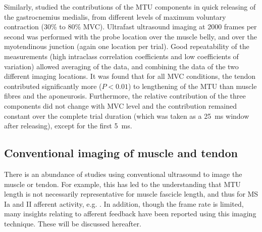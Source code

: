 Similarly, \citet{farcy_interaction_2014} studied the contributions of the MTU components in quick releasing of the gastrocnemius medialis, from different levels of maximum voluntary contraction (30\% to 80\% MVC). Ultrafast ultrasound imaging at 2000 frames per second was performed with the probe location over the muscle belly, and over the myotendinous junction (again one location per trial). Good repeatability of the measurements (high intraclass correlation coefficients and low coefficients of variation) allowed averaging of the data, and combining the data of the two different imaging locations. It was found that for all MVC conditions, the tendon contributed significantly more ($P<0.01$) to lengthening of the MTU than muscle fibres and the aponeurosis. 
Furthermore, the relative contribution of the three components did not change with MVC level and the contribution remained constant over the complete trial duration (which was taken as a \SI{25}{\milli\second} window after releasing), except for the first \SI{5}{\milli\second}. 






\subsection{Conventional imaging of muscle and tendon}
There is an abundance of studies using conventional ultrasound to image the muscle or tendon. For example, this has led to the understanding that MTU length is not necessarily representative for muscle fascicle length, and thus for MS Ia and II afferent activity, e.g. \cite{maas_is_2009, cronin_automatic_2011}. In addition, though the frame rate is limited, many insights relating to afferent feedback have been reported using this imaging technique. These will be discussed hereafter. 



